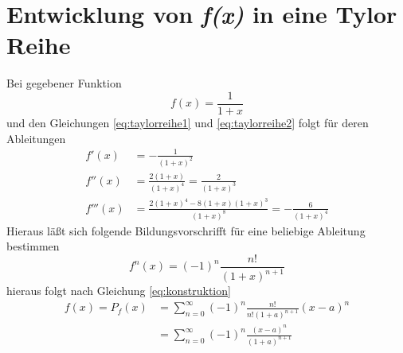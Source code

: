 \section{Entwicklung von \emph{f(x)} in eine Tylor Reihe}
Bei gegebener Funktion
\begin{equation}
    f\left(x\right) = \frac{1}{1+x}
\end{equation}
und den Gleichungen \ref{eq:taylorreihe1} und \ref{eq:taylorreihe2} folgt für deren Ableitungen
\begin{align}
    f'\left(x\right)    &= -\frac{1}{\left(1+x\right)^2} \\
    f''\left(x\right)   &=  \frac{2\left(1+x\right)}{\left(1+x\right)^4}
                         =  \frac{2}{\left(1+x\right)^3} \\
    f'''\left(x\right)  &=  \frac{2\left(1+x\right)^4 -8\left(1+x\right)\left(1+x\right)^3}
                            {\left(1+x\right)^8}
                         =  -\frac{6}{\left(1+x\right)^4}
\end{align}
Hieraus läßt sich folgende Bildungsvorschrifft für eine beliebige Ableitung bestimmen
\begin{equation}
    f^n\left(x\right) = \left(-1\right)^n \frac{n!}{\left(1+x\right)^{n+1}}
\end{equation}
hieraus folgt nach Gleichung \ref{eq:konstruktion}
\begin{align}
    f\left(x\right)  =  P_f\left(x\right) 
                    &= \sum_{n=0}^{\infty} \left(-1\right)^n
                        \frac{n!}{n!\left(1+a\right)^{n+1}}\left(x-a\right)^n\\
                    &=  \sum_{n=0}^{\infty} \left(-1\right)^n
                        \frac{\left(x-a\right)^n}{\left(1+a\right)^{n+1}}
\end{align}